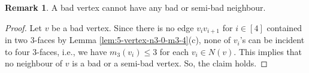 \documentclass[12pt, reqno]{amsart}
\theoremstyle{plain}
\theoremstyle{definition}
\newtheorem{remark}[equation]{Remark}
\numberwithin{equation}{section}
\begin{document}
\begin{remark}\label{rem:bad-no-bad}
A bad vertex cannot have any bad or semi-bad neighbour.
\end{remark}
\begin{proof}
Let $v$ be a bad vertex. %
Since there is no edge $v_iv_{i+1}$ for $i\in [4]$ contained in two $3$-faces by Lemma \ref{lem:5-vertex-n3-0-m3-4}(c),  none of $v_i$'s can be incident to four $3$-faces, i.e., we have $m_3(v_i)\leq 3$ for each $v_i\in N(v)$.  This implies that no neighbour of $v$ is a bad or a semi-bad vertex. So, the claim holds.
\end{proof}
\end{document}
